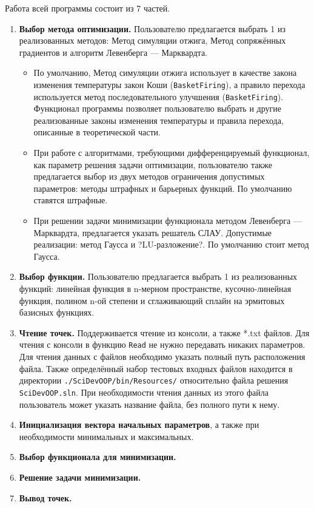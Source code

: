 Работа всей программы состоит из 7 частей.

\begin{enumerate}
	\item \textbf{Выбор метода оптимизации.} Пользователю предлагается выбрать 1 из реализованных методов: Метод симуляции отжига, Метод сопряжённых градиентов и алгоритм Левенберга — Марквардта.
	\begin{itemize}
		\item По умолчанию, Метод симуляции отжига использует в качестве закона изменения температуры закон Коши (\texttt{BasketFiring}), а правило перехода используется метод последовательного улучшения (\texttt{BasketFiring}). Функционал программы позволяет пользователю выбрать и другие реализованные законы изменения температуры и правила перехода, описанные в теоретической части.
		\item При работе с алгоритмами, требующими дифференцируемый функционал, как параметр решения задачи оптимизации, пользователю также предлагается выбор из двух методов ограничения допустимых параметров: методы штрафных и барьерных функций. По умолчанию ставятся штрафные.
		\item При решении задачи минимизации функционала методом Левенберга — Марквардта, предлагается указать решатель СЛАУ. Допустимые реализации: метод Гаусса и ?LU-разложение?. По умолчанию стоит метод Гаусса.
	\end{itemize}
	\item \textbf{Выбор функции.} Пользователю предлагается выбрать 1 из реализованных функций: линейная функция в n-мерном пространстве, кусочно-линейная функция, полином n-ой степени и сглаживающий сплайн на эрмитовых базисных функциях.
	\item \textbf{Чтение точек.} Поддерживается чтение из консоли, а также *.txt файлов. Для чтения с консоли в функцию \texttt{Read} не нужно передавать никаких параметров. Для чтения данных с файлов необходимо указать полный путь расположения файла. Также определённый набор тестовых входных файлов находится в директории \texttt{./SciDevOOP/bin/Resources/} относительно файла решения \texttt{SciDevOOP.sln}. При необходимости чтения данных из этого файла пользователь может указать название файла, без полного пути к нему.
	\item \textbf{Инициализация вектора начальных параметров}, а также при необходимости минимальных и максимальных.
	\item \textbf{Выбор функционала для минимизации.}
	\item \textbf{Решение задачи минимизации.}
	\item \textbf{Вывод точек.}
\end{enumerate}
